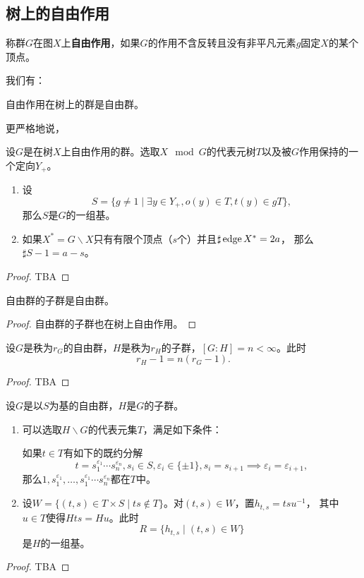 \subsection{树上的自由作用}
\begin{definition}\label{def-free}
称群$G$在图$X$上\textbf{自由作用}，如果$G$的作用不含反转且没有非平凡元素$g$固定$X$的某个顶点。
\end{definition}
我们有：
\begin{theorem}
    自由作用在树上的群是自由群。
\end{theorem}
更严格地说，
\begin{theorem}
    设$G$是在树$X$上自由作用的群。选取$X \mod{G}$的代表元树$T$以及被$G$作用保持的一个定向$Y_+$。
    \begin{enumerate}
        \item 设\[S = \{g \neq 1 \mid \exists y \in Y_+,o(y)\in T,t(y) \in gT\},\]
        那么$S$是$G$的一组基。
        \item 如果$X^* = G\backslash X$只有有限个顶点（$s$个）并且$\sharp \operatorname{edge} X^* = 2a$，
        那么$\sharp S-1 = a-s$。
    \end{enumerate}
\end{theorem}
\begin{proof}
    TBA
\end{proof}
\begin{theorem}[Schreier]
    自由群的子群是自由群。
\end{theorem}
\begin{proof}
    自由群的子群也在树上自由作用。
\end{proof}
\begin{corollary}
设$G$是秩为$r_G$的自由群，$H$是秩为$r_H$的子群，$[G:H] = n < \infty$。此时\[r_H - 1 = n(r_G-1).\]
\end{corollary}
\begin{proof}
    TBA
\end{proof}
\begin{proposition}
设$G$是以$S$为基的自由群，$H$是$G$的子群。
\begin{enumerate}
    \item 可以选取$H\backslash G$的代表元集$T$，满足如下条件：

    如果$t \in T$有如下的既约分解\[t = s_1^{\varepsilon_1}\cdots s_n^{\varepsilon_n}, s_i \in S, \varepsilon_i \in \{\pm 1\}, s_i = s_{i+1} \implies \varepsilon_i = \varepsilon_{i+1},\]
    那么$1,s_1^{\varepsilon_1},\ldots,s_1^{\varepsilon_1}\cdots s_n^{\varepsilon_n}$都在$T$中。

    \item 设$W = \{(t,s) \in T \times S \mid ts \not\in T\}$。对$(t,s) \in W$，置$h_{t,s} = tsu^{-1}$，
    其中$u \in T$使得$Hts = Hu$。此时\[R = \{h_{t,s} \mid (t,s) \in W\}\]是$H$的一组基。
\end{enumerate}
\end{proposition}
\begin{proof}
    TBA
\end{proof}
